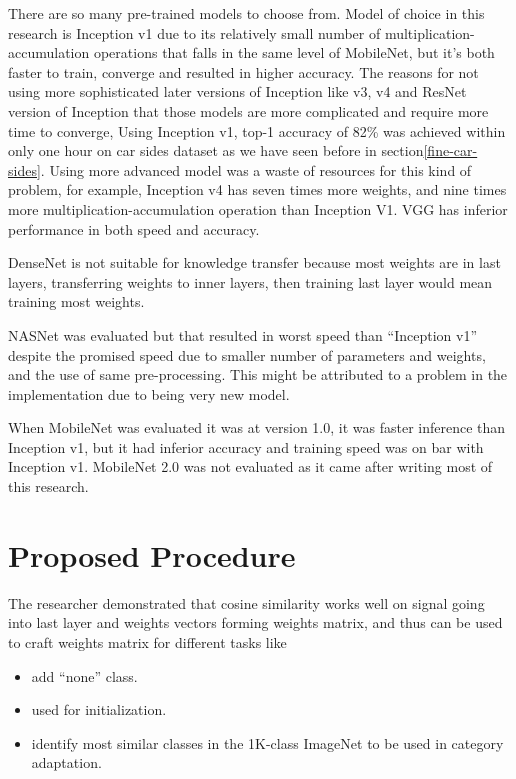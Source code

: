 There are so many pre-trained models to choose from. Model of choice in this research is Inception v1\autocite{szegedy2015going}
due to its relatively small number of multiplication-accumulation operations
that falls in the same level of MobileNet, but it's both faster to train, converge and resulted in higher accuracy.
The reasons for not using more sophisticated later versions of Inception like v3, v4 and ResNet version of Inception
that those models are more complicated and require more time to converge,
Using Inception v1, top-1 accuracy of 82\%  was achieved 
within only one hour on car sides dataset as we have seen before in section\ref{fine-car-sides}.
Using more advanced model was a waste of resources for this kind of problem,
for example, Inception v4 has seven times more weights,
and nine times more multiplication-accumulation operation than Inception V1.
VGG has inferior performance in both speed and accuracy.

DenseNet\autocite{huang2016densely} is not suitable for knowledge transfer because most weights are
in last layers, transferring weights to inner layers, then training last layer would mean training most weights.

NASNet was evaluated but that resulted in worst speed than ``Inception v1''
despite the promised speed due to smaller number of parameters and weights, and the use of same pre-processing.
This might be attributed to a problem in the implementation due to being very new model.

When MobileNet was evaluated it was at version 1.0, it was faster inference than Inception v1,
but it had inferior accuracy and training speed was on bar with Inception v1.
MobileNet 2.0\autocite{sandler2018inverted} was not evaluated as it came after writing most of this research.

\section{Proposed Procedure}

The researcher demonstrated that cosine similarity works well on signal going into last layer
and weights vectors forming weights matrix, and thus can be used to craft weights matrix for different tasks like

\begin{itemize}
\item add ``none'' class.
\item used for initialization.
\item identify most similar classes in the 1K-class ImageNet to be used in category adaptation.
\end{itemize}

